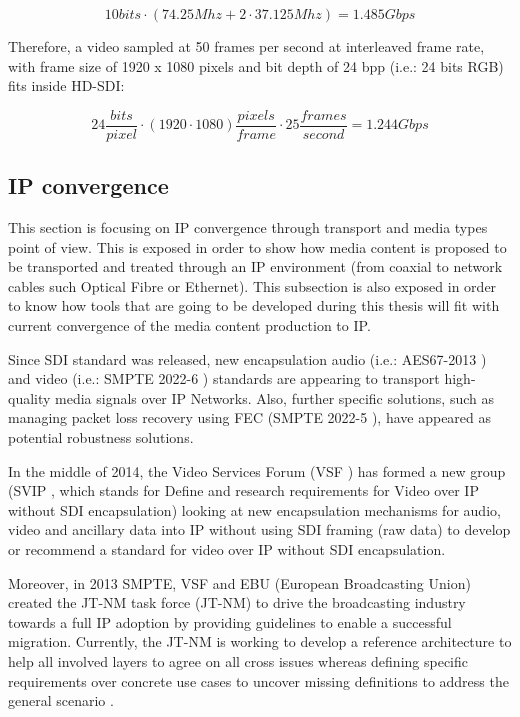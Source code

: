\begin{equation}\label{E:sr}
10 bits \cdot (74.25Mhz + 2 \cdot 37.125Mhz) = 1.485 Gbps
\end{equation}

Therefore, a video sampled at 50 frames per second at interleaved frame rate, with frame size of 1920 x 1080 pixels and bit depth of 24 bpp (i.e.: 24 bits RGB) fits inside HD-SDI:

\begin{equation}\label{E:srex}
24 \frac{bits}{pixel} \cdot (1920 \cdot 1080) \frac{pixels}{frame} \cdot 25 \frac{frames}{second} = 1.244 Gbps
\end{equation}

\subsection{IP convergence}

This section is focusing on IP convergence through transport and media types point of
view. This is exposed in order to show how media content is proposed to be transported
and treated through an IP environment (from coaxial to network cables such Optical Fibre
or Ethernet). This subsection is also exposed in order to know how tools that are going
to be developed during this thesis will fit with current convergence of the media content
production to IP. 

Since SDI standard was released, new encapsulation audio (i.e.: AES67-2013 \cite{AES}) and video (i.e.: SMPTE 2022-6 \cite{ST2022}) standards are appearing to transport high-quality media signals over IP Networks. Also, further specific solutions, such as managing packet loss recovery using FEC (SMPTE 2022-5 \cite{ST20225}), have appeared as potential robustness solutions.

In the middle of 2014, the Video Services Forum (VSF \cite{VSF}) has formed a new group (SVIP \cite{SVIP}, which stands for Define and research requirements for Video over IP without SDI encapsulation) looking at new encapsulation mechanisms for audio, video and ancillary data into IP without using SDI framing (raw data) to develop or recommend a standard for video over IP without SDI encapsulation.

Moreover, in 2013 SMPTE, VSF and EBU (European Broadcasting Union) created the JT-NM task force (JT-NM) to drive the broadcasting industry towards a full IP adoption by providing guidelines to enable a successful migration. Currently, the JT-NM is working to develop a reference architecture to help all involved layers to agree on all cross issues whereas defining specific requirements over concrete use cases to uncover missing definitions to address the general scenario \cite{jtnm}.

